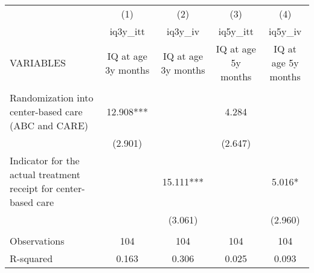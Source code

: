 \documentclass[]{article}
\begin{document}
\begin{tabular}{lcccc} \hline
 & (1) & (2) & (3) & (4) \\
 & iq3y\_itt & iq3y\_iv & iq5y\_itt & iq5y\_iv \\
VARIABLES & IQ at age 3y months & IQ at age 3y months & IQ at age 5y months & IQ at age 5y months \\ \hline
 &  &  &  &  \\
Randomization into center-based care (ABC and CARE) & 12.908*** &  & 4.284 &  \\
 & (2.901) &  & (2.647) &  \\
Indicator for the actual treatment receipt for center-based care &  & 15.111*** &  & 5.016* \\
 &  & (3.061) &  & (2.960) \\
 &  &  &  &  \\
Observations & 104 & 104 & 104 & 104 \\
 R-squared & 0.163 & 0.306 & 0.025 & 0.093 \\ \hline
\end{tabular}
\end{document}
